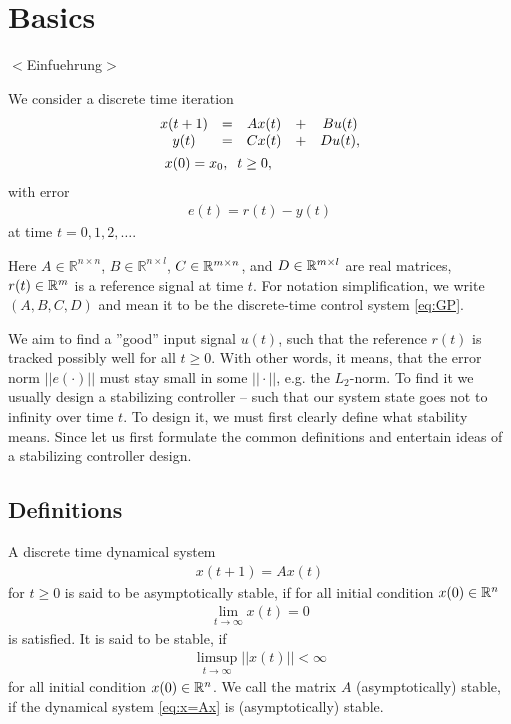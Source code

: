 \chapter{Basics} 
\label{ChGrDef}
{\color{red}$<$Einfuehrung$>$}

We consider a  discrete time iteration
\begin{align}
\label{eq:GP}
\begin{split}
&\begin{array}{c c c c c}
x(t+1) &= &A x(t)& + &B u(t)  \\
y ( t) &= &C x(t)&  + &D u(t),\\ 
\end{array}\\
&\; \;\;x(0) =x_0 , \; \;  t \geq 0,
\end{split}
\end{align}
 with error 
\begin{align}
\label{eq:error}
e(t) =r(t) - y(t)
\end{align}
at time $t  = 0, 1, 2, \dots$.

Here $A \in \mathbb{R}^{n\times n}$, $B \in \mathbb{R}^{n \times l}$, $C \in {\mathbb{R}}^{m \times n}$, and $D \in {\mathbb{R}}^{m\times l}$ are real matrices, $r(t) \in {\mathbb{R}}^{m}$ is a reference signal at time $t$. For notation simplification, we write $(A, B,C,D)$ and mean it to be the discrete-time control system \eqref{eq:GP}.



We aim to find a ''good'' input signal $u(t)$, such that the reference $r(t)$ is tracked possibly well for all $t \geq 0$. With other words, it means, that the error norm $||e(\cdot)||$ must stay small in some  $||\cdot||$, e.g. the $L_2$-norm.
To find it we usually design a stabilizing controller 
 -- such that our system state goes not to infinity over time $t$. 
To design it, we must first clearly define what stability means. Since let us first formulate the common definitions and entertain ideas of a stabilizing controller design. 

\section{Definitions}

\begin{defi}
	A discrete time dynamical system
	\begin{align}
	\label{eq:x=Ax}
	x(t+1) = A x(t)
	\end{align}
	for $t \geq 0$ 
	is said to be asymptotically stable, if for all initial condition $x(0) \in {\mathbb{R}}^n$
	\begin{align}
	\lim_{t \to \infty} x(t) = 0
	\end{align}	
    is satisfied. 
	It is said to be stable, if 
	\begin{align}
	\limsup_{t \to \infty} ||x(t)|| < \infty
	\end{align}
	for all	 initial condition $x(0) \in {\mathbb{R}}^n$.
	We call the matrix $A$ (asymptotically) stable, if the dynamical system \eqref{eq:x=Ax} is (asymptotically) stable.
\end{defi}


